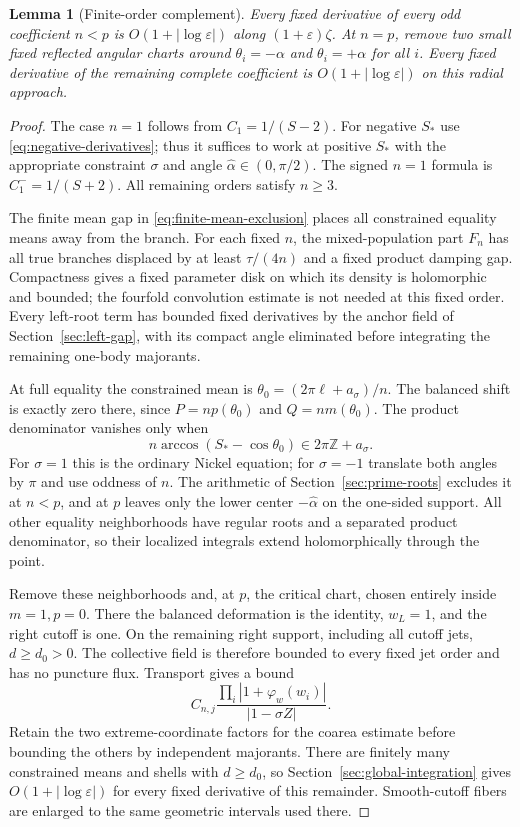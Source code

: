 \documentclass[11pt]{article}
\numberwithin{equation}{section}
\newtheorem{lemma}[theorem]{Lemma}
\theoremstyle{remark}\newtheorem{remark}[theorem]{Remark}
\begin{document}
\begin{lemma}[Finite-order complement]\label{lem:finite-complement}
Every fixed derivative of every odd coefficient $n<p$ is
$O(1+|\log\varepsilon|)$ along $(1+\varepsilon)\zeta$.
At $n=p$, remove two small fixed reflected angular charts around
$\theta_i=-\alpha$ and $\theta_i=+\alpha$ for all $i$.
Every fixed derivative of the remaining complete coefficient is
$O(1+|\log\varepsilon|)$ on this radial approach.
\end{lemma}
\begin{proof}
The case $n=1$ follows from $C_1=1/(S-2)$.
For negative $S_*$ use \eqref{eq:negative-derivatives}; thus
it suffices to work at positive $S_*$ with the appropriate
constraint $\sigma$ and angle $\widehat\alpha\in(0,\pi/2)$.
The signed $n=1$ formula is $C_1^-=1/(S+2)$.
All remaining orders satisfy $n\ge3$.

The finite mean gap in \eqref{eq:finite-mean-exclusion}
places all constrained equality means away from the branch.
For each fixed $n$, the mixed-population part $F_n$ has all
true branches displaced by at least $\tau/(4n)$ and a fixed
product damping gap. Compactness gives a fixed parameter disk
on which its density is holomorphic and bounded; the fourfold
convolution estimate is not needed at this fixed order.
Every left-root term has bounded fixed derivatives by the
anchor field of Section~\ref{sec:left-gap}, with its compact
angle eliminated before integrating the remaining one-body
majorants.

At full equality the constrained mean is
$\theta_0=(2\pi\ell+a_\sigma)/n$.
The balanced shift is exactly zero there, since
$P=np(\theta_0)$ and $Q=nm(\theta_0)$.
The product denominator vanishes only when
\[
 n\arccos(S_*-\cos\theta_0)\in2\pi\mathbb Z+a_\sigma.
\]
For $\sigma=1$ this is the ordinary Nickel equation; for
$\sigma=-1$ translate both angles by $\pi$ and use oddness of
$n$. The arithmetic of Section~\ref{sec:prime-roots} excludes
it at $n<p$, and at $p$ leaves only the lower center
$-\widehat\alpha$ on the one-sided support.
All other equality neighborhoods have regular roots and a
separated product denominator, so their localized integrals
extend holomorphically through the point.

Remove these neighborhoods and, at $p$, the critical chart,
chosen entirely inside $m=1,p=0$. There the balanced deformation
is the identity, $w_L=1$, and the right cutoff is one.
On the remaining right support, including all cutoff jets,
$d\ge d_0>0$. The collective field is therefore bounded to
every fixed jet order and has no puncture flux.
Transport gives a bound
\[
 C_{n,j}\frac{\prod_i|1+\varphi_w(w_i)|}{|1-\sigma Z|}.
\]
Retain the two extreme-coordinate factors for the coarea
estimate before bounding the others by independent majorants.
There are finitely many constrained means and shells with
$d\ge d_0$, so Section~\ref{sec:global-integration} gives
$O(1+|\log\varepsilon|)$ for every fixed derivative of this
remainder. Smooth-cutoff fibers are enlarged to the same
geometric intervals used there.


\end{proof}
\end{document}
